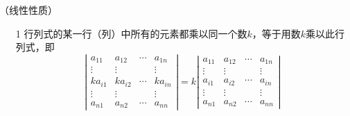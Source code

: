 \begin{frame}
  \begin{block}{（线性性质） }
    \begin{itemize}
    \item[1] 行列式的某一行（列）中所有的元素都乘以同一个数$k$，等于用数$k$乘以此行列式，即
      \begin{equation}\label{xz3-1}
        \left|
        \begin{array}{ccccc}
          a_{11}  & a_{12} & \cdots & a_{1n} \\
          \vdots & \vdots     &        & \vdots \\
          ka_{i1}  & ka_{i2} & \cdots & ka_{in} \\
          \vdots & \vdots     &        & \vdots \\
          a_{n1}  & a_{n2} & \cdots & a_{nn}
        \end{array}
        \right| = k
        \left|
        \begin{array}{ccccc}
          a_{11}  & a_{12} & \cdots & a_{1n} \\
          \vdots & \vdots     &        & \vdots \\
          a_{i1}  & a_{i2} & \cdots & a_{in} \\
          \vdots & \vdots     &        & \vdots \\
          a_{n1}  & a_{n2} & \cdots & a_{nn}
        \end{array}
        \right|
      \end{equation}
    \end{itemize}
  \end{block}
\end{frame}




